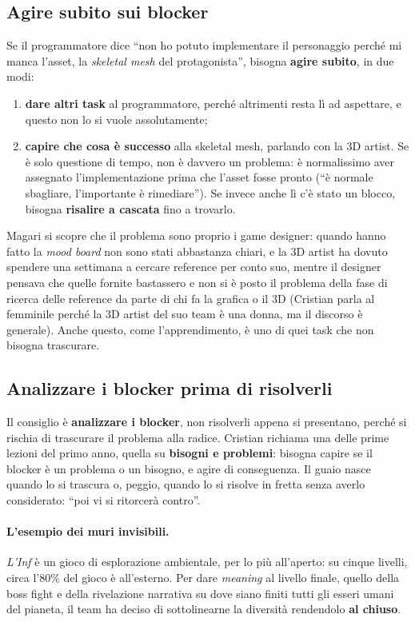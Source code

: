 \subsection{Agire subito sui blocker}

Se il programmatore dice ``non ho potuto implementare il personaggio perché mi
manca l'asset, la \emph{skeletal mesh} del protagonista'', bisogna
\textbf{agire subito}, in due modi:
\begin{enumerate}
  \item \textbf{dare altri task} al programmatore, perché altrimenti resta lì
        ad aspettare, e questo non lo si vuole assolutamente;
  \item \textbf{capire che cosa è successo} alla skeletal mesh, parlando con
        la 3D artist. Se è solo questione di tempo, non è davvero un problema:
        è normalissimo aver assegnato l'implementazione prima che l'asset
        fosse pronto (``è normale sbagliare, l'importante è rimediare''). Se
        invece anche lì c'è stato un blocco, bisogna \textbf{risalire a
        cascata} fino a trovarlo.
\end{enumerate}
Magari si scopre che il problema sono proprio i game designer: quando hanno
fatto la \emph{mood board} non sono stati abbastanza chiari, e la 3D artist ha
dovuto spendere una settimana a cercare reference per conto suo, mentre il
designer pensava che quelle fornite bastassero e non si è posto il problema
della fase di ricerca delle reference da parte di chi fa la grafica o il 3D
(Cristian parla al femminile perché la 3D artist del suo team è una donna, ma
il discorso è generale). Anche questo, come l'apprendimento, è uno di quei
task che non bisogna trascurare.

\subsection{Analizzare i blocker prima di risolverli}

Il consiglio è \textbf{analizzare i blocker}, non risolverli appena si
presentano, perché si rischia di trascurare il problema alla radice. Cristian
richiama una delle prime lezioni del primo anno, quella su \textbf{bisogni e
problemi}: bisogna capire se il blocker è un problema o un bisogno, e agire di
conseguenza. Il guaio nasce quando lo si trascura o, peggio, quando lo si
risolve in fretta senza averlo considerato: ``poi vi si ritorcerà contro''.

\paragraph{L'esempio dei muri invisibili.} \emph{L'Inf} è un gioco di
esplorazione ambientale, per lo più all'aperto: su cinque livelli, circa
l'80\% del gioco è all'esterno. Per dare \emph{meaning} al livello finale,
quello della boss fight e della rivelazione narrativa su dove siano finiti
tutti gli esseri umani del pianeta, il team ha deciso di sottolinearne la
diversità rendendolo \textbf{al chiuso}.

